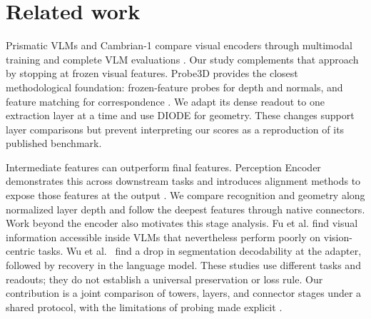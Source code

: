 \section{Related work}
Prismatic VLMs and Cambrian-1 compare visual encoders through multimodal training and
complete VLM evaluations \citep{karamcheti2024prismatic,tong2024cambrian}.
Our study complements that approach by stopping at frozen visual features.
Probe3D provides the closest methodological foundation: frozen-feature probes for depth
and normals, and feature matching for correspondence \citep{elbanani2024probe3d}.
We adapt its dense readout to one extraction layer at a time and use DIODE for geometry.
These changes support layer comparisons but prevent interpreting our scores as a
reproduction of its published benchmark.

Intermediate features can outperform final features. Perception Encoder demonstrates
this across downstream tasks and introduces alignment methods to expose those features
at the output \citep{bolya2025perception}. We compare recognition and geometry along
normalized layer depth and follow the deepest features through native connectors.
Work beyond the encoder also motivates this stage analysis. Fu et al.
\citep{fu2025hidden} find visual information accessible inside VLMs that nevertheless
perform poorly on vision-centric tasks. Wu et al.\ \citep{wu2026dropoff} find a drop in
segmentation decodability at the adapter, followed by recovery in the language model.
These studies use different tasks and readouts; they do not establish a universal
preservation or loss rule. Our contribution is a joint comparison of towers, layers,
and connector stages under a shared protocol, with the limitations of probing made
explicit \citep{belinkov2022probing}.
